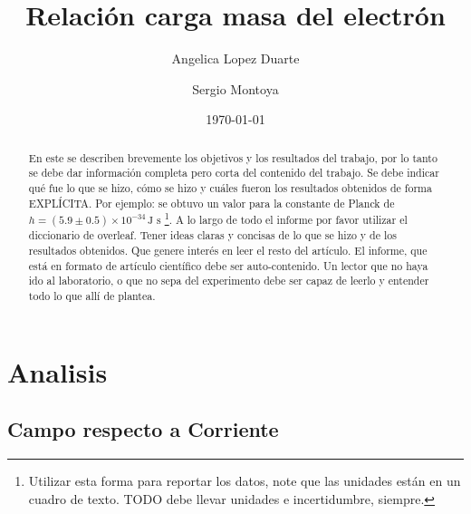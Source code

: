 \documentclass[a4paper, amsfonts, amssymb, amsmath, reprint, showkeys, nofootinbib, twoside]{revtex4-1}
\begin{document}
\title{Relación carga masa del electrón}


\author{Angelica Lopez Duarte}

\author{Sergio Montoya}
  


\date{\today} %

\begin{abstract}

En este se describen brevemente los objetivos y los resultados del trabajo, por lo tanto se debe dar información completa pero corta del contenido del trabajo. Se debe indicar qué fue lo que se hizo, cómo se hizo y cuáles fueron los resultados obtenidos de forma EXPLÍCITA. Por ejemplo: se obtuvo un valor para la constante de Planck de $h=(5.9\pm 0.5)\times 10^{-34}\,\text{J s}$ \footnote{Utilizar esta forma para reportar los datos, note que las unidades están en un cuadro de texto. TODO debe llevar unidades e incertidumbre, siempre.}. A lo largo de todo el informe por favor utilizar el diccionario de overleaf. Tener ideas claras y concisas de lo que se hizo y de los resultados obtenidos. Que genere interés en leer el resto del artículo. El informe, que está en formato de artículo científico debe ser auto-contenido. Un lector que no haya ido al laboratorio, o que no sepa del experimento debe ser capaz de leerlo y entender todo lo que allí de plantea.

\end{abstract}

\maketitle

\section{Analisis}

\subsection{Campo respecto a Corriente}
\end{document}
